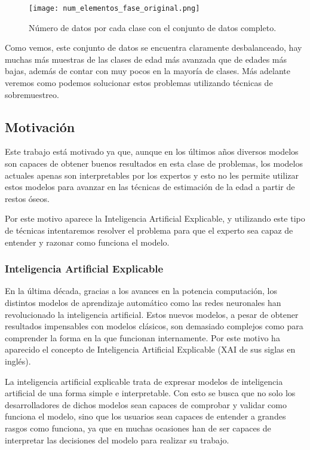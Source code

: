 \begin{figure}[H]
	\centering
	\texttt{[image: num\_elementos\_fase\_original.png]}
	\caption{Número de datos por cada clase con el conjunto de datos completo.}
	\label{fig:conteo_original}

\end{figure}

Como vemos, este conjunto de datos se encuentra claramente desbalanceado, hay muchas más muestras de las clases de edad más avanzada que de edades más bajas, además de contar con muy pocos en la mayoría de clases. Más adelante veremos como podemos solucionar estos problemas utilizando técnicas de sobremuestreo.

\subsection{Motivación}

Este trabajo está motivado ya que, aunque en los últimos años diversos modelos son capaces de obtener buenos resultados en esta clase de problemas, los modelos actuales apenas son interpretables por los expertos y esto no les permite utilizar estos modelos para avanzar en las técnicas de estimación de la edad a partir de restos óseos.

Por este motivo aparece la Inteligencia Artificial Explicable, y utilizando este tipo de técnicas intentaremos resolver el problema para que el experto sea capaz de entender y razonar como funciona el modelo.


\subsubsection{Inteligencia Artificial Explicable}

En la última década, gracias a los avances en la potencia computación, los distintos modelos de aprendizaje automático como las redes neuronales han revolucionado la inteligencia artificial. Estos nuevos modelos, a pesar de obtener resultados impensables con modelos clásicos, son demasiado complejos como para comprender la forma en la que funcionan internamente. Por este motivo ha aparecido el concepto de Inteligencia Artificial Explicable \cite{XAI} (XAI de sus siglas en inglés).

La inteligencia artificial explicable trata de expresar modelos de inteligencia artificial de una forma simple e interpretable. Con esto se busca que no solo los desarrolladores de dichos modelos sean capaces de comprobar y validar como funciona el modelo, sino que los usuarios sean capaces de entender a grandes rasgos como funciona, ya que en muchas ocasiones han de ser capaces de interpretar las decisiones del modelo para realizar su trabajo.

